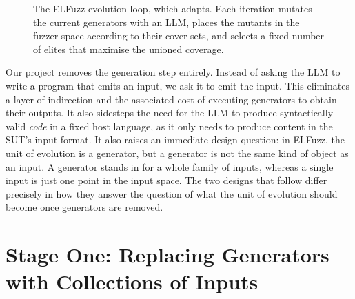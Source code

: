 \lilspace
\begin{figure}[h]
    \centering
    \caption{The ELFuzz evolution loop, which \toolname{} adapts. Each iteration mutates the current generators with an LLM, places the mutants in the fuzzer space according to their cover sets, and selects a fixed number of elites that maximise the unioned coverage.}
    \label{fig:elfuzz-pipeline}
\end{figure}

Our project removes the generation step entirely. Instead of asking the LLM to write a program that emits an input, we ask it to emit the input. This eliminates a layer of indirection and the associated cost of executing generators to obtain their outputs. It also sidesteps the need for the LLM to produce syntactically valid \textit{code} in a fixed host language, as it only needs to produce content in the SUT's input format. It also raises an immediate design question: in ELFuzz, the unit of evolution is a generator, but a generator is not the same kind of object as an input. A generator stands in for a whole family of inputs, whereas a single input is just one point in the input space. The two designs that follow differ precisely in how they answer the question of what the unit of evolution should become once generators are removed.

\section{Stage One: Replacing Generators with Collections of Inputs}

